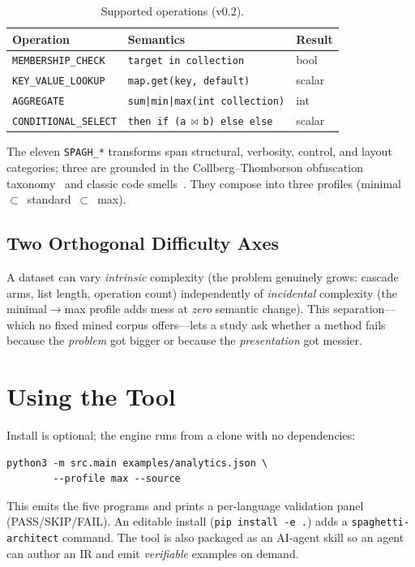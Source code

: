 \documentclass[sigconf,nonacm=false]{acmart}
\begin{document}
\begin{table}[t]
\caption{Supported operations (v0.2).}
\label{tab:ops}
\begin{tabular}{@{}lll@{}}
\toprule
Operation & Semantics & Result \\
\midrule
\texttt{MEMBERSHIP\_CHECK} & \texttt{target in collection} & bool \\
\texttt{KEY\_VALUE\_LOOKUP} & \texttt{map.get(key, default)} & scalar \\
\texttt{AGGREGATE} & \texttt{sum|min|max(int collection)} & int \\
\texttt{CONDITIONAL\_SELECT} & \texttt{then if (a$\,\bowtie\,$b) else else} & scalar \\
\bottomrule
\end{tabular}
\end{table}

The eleven \texttt{SPAGH\_*} transforms span structural, verbosity, control, and
layout categories; three are grounded in the Collberg--Thomborson obfuscation
taxonomy~\cite{collberg1997taxonomy} and classic code
smells~\cite{fowler-refactoring}. They compose into three profiles
(\textsf{minimal}~$\subset$~\textsf{standard}~$\subset$~\textsf{max}).

\subsection{Two Orthogonal Difficulty Axes}
\label{sec:axes}
A dataset can vary \emph{intrinsic} complexity (the problem genuinely grows: cascade
arms, list length, operation count) independently of \emph{incidental} complexity
(the \textsf{minimal}$\rightarrow$\textsf{max} profile adds mess at \emph{zero}
semantic change). This separation---which no fixed mined corpus offers---lets a study
ask whether a method fails because the \emph{problem} got bigger or because the
\emph{presentation} got messier.

\section{Using the Tool}
\label{sec:usage}
Install is optional; the engine runs from a clone with no dependencies:
\begin{verbatim}
python3 -m src.main examples/analytics.json \
        --profile max --source
\end{verbatim}
This emits the five programs and prints a per-language validation panel
(\textsf{PASS}/\textsf{SKIP}/\textsf{FAIL}). An editable install
(\texttt{pip install -e .}) adds a \texttt{spaghetti-architect} command. The tool is
also packaged as an AI-agent skill so an agent can author an IR and emit
\emph{verifiable} examples on demand. %
\end{document}
